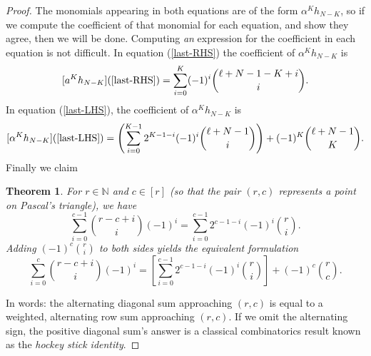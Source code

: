 \documentclass[11pt]{article}
\theoremstyle{plain}
\newtheorem{theorem}[fact]{Theorem}
\theoremstyle{definition}
\theoremstyle{definition}
\newcounter{equation}
\newcommand{\bb}[1]{\mathbb{#1}}
\begin{document}
\begin{proof}
The monomials appearing in both equations are of the form $\alpha^Kh_{N-K}$, so if we compute the coefficient of that monomial for each equation, and show they agree, then we will be done. Computing \textit{an} expression for the coefficient in each equation is not difficult. In equation (\ref{last-RHS}) the coefficient of $\alpha^Kh_{N-K}$ is 
$$
[a^Kh_{N-K}](\ref{last-RHS}) = \sum_{i=0}^K(-1)^i{\ell+N-1-K+i\choose i}. 
$$
In equation (\ref{last-LHS}), the coefficient of $\alpha^Kh_{N-K}$ is 
$$
[\alpha^Kh_{N-K}](\ref{last-LHS}) = \left(\sum_{i=0}^{K-1} 2^{K-1-i}(-1)^i{\ell+N-1\choose i}\right)+(-1)^{K}{\ell+N-1\choose K}.
$$
Finally we claim
\begin{theorem}
For $r \in \bb N$ and $c\in [r]$ (so that the pair $(r,c)$ represents a point on Pascal's triangle), we have 
$$
\sum_{i=0}^{c-1}{r-c+i\choose i}(-1)^i = \sum_{i=0}^{c-1}2^{c-1-i}(-1)^i{r\choose i}.
$$
Adding $(-1)^c{r\choose i}$ to both sides yields the equivalent formulation
$$
\sum_{i=0}^c{r-c+i\choose i}(-1)^i = \left[\sum_{i=0}^{c-1}2^{c-1-i}(-1)^i{r\choose i}\right] + (-1)^c {r\choose c}.
$$
\end{theorem}
In words: the alternating diagonal sum approaching $(r,c)$ is equal to a weighted, alternating row sum approaching $(r,c)$. If we omit the alternating sign, the positive diagonal sum's answer is a classical combinatorics result known as the \textit{hockey stick identity}.


\end{proof}
\end{document}
